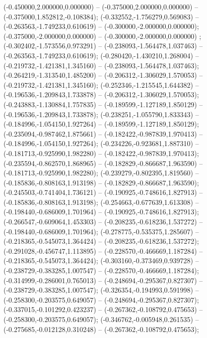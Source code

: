  (-0.450000,2.000000,0.000000) -- (-0.375000,2.000000,0.000000) -- (-0.375000,1.852812,-0.108384);
 (-0.332552,-1.756279,0.569083) -- (-0.263563,-1.749233,0.610619) -- (-0.300000,-2.000000,0.000000);
 (-0.375000,-2.000000,0.000000) -- (-0.300000,-2.000000,0.000000) ;
 (-0.302402,-1.573556,0.973291) -- (-0.238093,-1.564478,1.037463) -- (-0.263563,-1.749233,0.610619);
 (-0.280420,-1.430210,1.268004) -- (-0.219732,-1.421381,1.345160) -- (-0.238093,-1.564478,1.037463);
 (-0.264219,-1.313540,1.485200) -- (-0.206312,-1.306029,1.570053) -- (-0.219732,-1.421381,1.345160);
 (-0.252346,-1.215545,1.644382) -- (-0.196536,-1.209843,1.733878) -- (-0.206312,-1.306029,1.570053);
 (-0.243883,-1.130884,1.757835) -- (-0.189599,-1.127189,1.850129) -- (-0.196536,-1.209843,1.733878);
 (-0.238251,-1.055790,1.833343) -- (-0.184996,-1.054150,1.927264) -- (-0.189599,-1.127189,1.850129);
 (-0.235094,-0.987462,1.875661) -- (-0.182422,-0.987839,1.970413) -- (-0.184996,-1.054150,1.927264);
 (-0.234226,-0.923681,1.887310) -- (-0.181713,-0.925990,1.982280) -- (-0.182422,-0.987839,1.970413);
 (-0.235594,-0.862570,1.868965) -- (-0.182829,-0.866687,1.963590) -- (-0.181713,-0.925990,1.982280);
 (-0.239279,-0.802395,1.819560) -- (-0.185836,-0.808163,1.913198) -- (-0.182829,-0.866687,1.963590);
 (-0.245503,-0.741404,1.736121) -- (-0.190925,-0.748616,1.827913) -- (-0.185836,-0.808163,1.913198);
 (-0.254663,-0.677639,1.613308) -- (-0.198440,-0.686009,1.701964) -- (-0.190925,-0.748616,1.827913);
 (-0.266547,-0.609064,1.453303) -- (-0.208235,-0.618236,1.537272) -- (-0.198440,-0.686009,1.701964);
 (-0.278775,-0.535375,1.285607) -- (-0.218365,-0.545073,1.364424) -- (-0.208235,-0.618236,1.537272);
 (-0.291028,-0.456747,1.113895) -- (-0.228570,-0.466669,1.187284) -- (-0.218365,-0.545073,1.364424);
 (-0.303160,-0.373469,0.939728) -- (-0.238729,-0.383285,1.007547) -- (-0.228570,-0.466669,1.187284);
 (-0.314999,-0.286001,0.765013) -- (-0.248694,-0.295367,0.827307) -- (-0.238729,-0.383285,1.007547);
 (-0.326354,-0.194993,0.591998) -- (-0.258300,-0.203575,0.649057) -- (-0.248694,-0.295367,0.827307);
 (-0.337015,-0.101292,0.423237) -- (-0.267362,-0.108792,0.475653) -- (-0.258300,-0.203575,0.649057);
 (-0.346762,-0.005948,0.261535) -- (-0.275685,-0.012128,0.310248) -- (-0.267362,-0.108792,0.475653);
